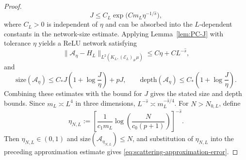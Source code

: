 \documentclass{article}
\numberwithin{equation}{section}
\theoremstyle{plain}
\begin{document}
\begin{proof}
\begin{equation*}
		J
		\le
		C_L\exp\bigl(Cm_L\eta^{-1/\hat s}\bigr),
	\end{equation*}
	where $C_L>0$ is independent of $\eta$ and can be absorbed into
	the $L$-dependent constants in the network-size estimate.
	Applying Lemma~\ref{lem:PC-J} with tolerance $\eta$ yields a ReLU network satisfying
	\begin{equation*}
	\|\mathcal A_\eta-H_L\|_{L^2(K_L,(\mathcal E_L)_{\#}\mu)}
	\le C\eta+CL^{-\hat s},
	\end{equation*}
	and
	\begin{equation*}
	\mathrm{size}(\mathcal A_\eta)
	\le C_*J\left(1+\log\frac{J}{\eta}\right)+pJ,
	\qquad
	\mathrm{depth}(\mathcal A_\eta)
	\le C_*\left(1+\log\frac{J}{\eta}\right).
	\end{equation*}
	Combining these estimates with the bound for $J$ gives the stated size and depth bounds. Since $m_L\asymp L^4$ in three dimensions, $L^{-\hat s}\asymp m_L^{-\hat s/4}$.
	For $N> N_{0,L}$, define
	\begin{equation*}
	\eta_{N,L}
	:=
	\left[
	\frac{1}{c_1m_L}
	\log\!\left(\frac{N}{c_0(p+1)}\right)
	\right]^{-\hat s}.
	\end{equation*}
	Then $\eta_{N,L}\in(0,1)$ and $\mathrm{size}(\mathcal A_{\eta_{N,L}})\le N$, and substitution of $\eta_{N,L}$ into the preceding approximation estimate gives \eqref{eq:scattering-approximation-error}.
	\end{proof}
 
\end{document}
